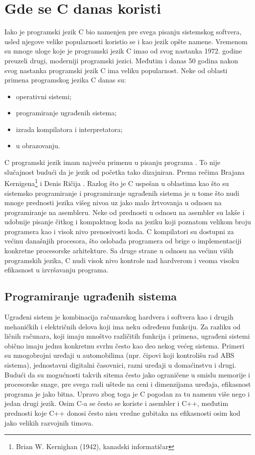 \documentclass[a4paper]{article}
\begin{document}
{\section{Gde se C danas koristi}
Iako je programski jezik C bio namenjen pre svega pisanju sistemskog softvera, usled njegove velike popularnosti koristio se i kao jezik opšte namene. Vremenom su mnoge uloge koje je programski jezik C imao od svog nastanka 1972. godine preuzeli drugi, moderniji programski jezici. Međutim i danas 50 godina nakon svog nastanka programski jezik C ima veliku popularnost. Neke od oblasti primena programskog jezika C danas su:
\begin{itemize}
    \item operativni sistemi;
    \item programiranje ugrađenih sistema;
    \item izrada kompilatora i interpretatora;
    \item u obrazovanju.
\end{itemize}
C programski jezik imam najveću primenu u pisanju programa . To nije slučajnost budući da je jezik od početka tako dizajniran. Prema rečima Brajana Kernigena\footnote{Brian W. Kernighan (1942), kanadski informatičar} i Denis Ričija . Razlog što je C uspešan u oblastima kao što su sistemsko programiranje i programiranje ugrađenih sistema je u tome što nudi mnoge prednosti jezika višeg nivoa uz jako malo žrtvovanja u odnosu na programiranje na asembleru. Neke od prednosti u odnosu na asembler su lakše i udobnije pisanje čitkog i kompaktnog koda na jeziku koji poznatom velikom broju programera kao i visok nivo prenosivosti koda. C kompilatori su dostupni za većinu današnjih procesora, što oslobađa programera od brige o implementaciji konkretne procesorske arhitekture. Sa druge strane u odnosu na većinu viših programskih jezika, C nudi visok nivo kontrole nad hardverom i veoma visoku efikasnost u izvršavanju programa.

\subsection{Programiranje ugrađenih sistema}
Ugrađeni sistem je kombinacija računarskog hardvera i softvera kao i drugih mehaničkih i električnih
delova koji ima neku određenu funkciju. Za razliku od ličnih računara, koji imaju mnoštvo različitih funkcija i primena, ugrađeni sistemi obično imaju jednu konkretnu svrhu često kao deo nekog većeg sistema. Primeri su mnogobrojni uređaji u automobilima (npr. čipovi koji kontrolišu rad ABS sistema), jednostavni digitalni časovnici, razni uređaji u  domaćinstvu i drugi. Budući da su mogućnosti takvih sitema često jako ograničene u smislu memorije i procesorske snage, pre svega radi uštede na ceni i dimenzijama uređaja, efikasnost programa je jako bitna. Upravo zbog toga je C pogodan za tu namenu više nego i jedan drugi jezik. Osim C-a se često se koriste i asembler i C++, međutim prednosti koje C++ donosi često nisu vredne gubitaka na efikasnosti osim kod jako velikih razvojnih timova.

}
\end{document}
